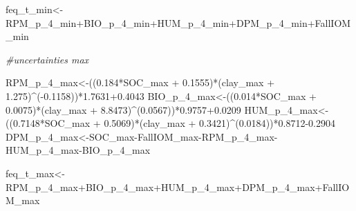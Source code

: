 \documentclass[
  10pt,
  b5paper,
]{book}
\newenvironment{Shaded}{\begin{snugshade}}{\end{snugshade}}
\newcommand{\CommentTok}[1]{\textcolor[rgb]{0.56,0.35,0.01}{\textit{#1}}}
\newcommand{\FloatTok}[1]{\textcolor[rgb]{0.00,0.00,0.81}{#1}}
\newcommand{\NormalTok}[1]{#1}
\newcommand{\OtherTok}[1]{\textcolor[rgb]{0.56,0.35,0.01}{#1}}
\newcommand{\SpecialCharTok}[1]{\textcolor[rgb]{0.00,0.00,0.00}{#1}}
\begin{document}
\begin{Shaded}
\begin{Highlighting}[]
\NormalTok{feq\_t\_min}\OtherTok{\textless{}{-}}\NormalTok{RPM\_p\_4\_min}\SpecialCharTok{+}\NormalTok{BIO\_p\_4\_min}\SpecialCharTok{+}\NormalTok{HUM\_p\_4\_min}\SpecialCharTok{+}\NormalTok{DPM\_p\_4\_min}\SpecialCharTok{+}\NormalTok{FallIOM\_min}

\CommentTok{\#uncertainties max}

\NormalTok{RPM\_p\_4\_max}\OtherTok{\textless{}{-}}\NormalTok{((}\FloatTok{0.184}\SpecialCharTok{*}\NormalTok{SOC\_max }\SpecialCharTok{+} \FloatTok{0.1555}\NormalTok{)}\SpecialCharTok{*}\NormalTok{(clay\_max }\SpecialCharTok{+} \FloatTok{1.275}\NormalTok{)}\SpecialCharTok{\^{}}\NormalTok{(}\SpecialCharTok{{-}}\FloatTok{0.1158}\NormalTok{))}\SpecialCharTok{*}\FloatTok{1.7631+0.4043}
\NormalTok{BIO\_p\_4\_max}\OtherTok{\textless{}{-}}\NormalTok{((}\FloatTok{0.014}\SpecialCharTok{*}\NormalTok{SOC\_max }\SpecialCharTok{+} \FloatTok{0.0075}\NormalTok{)}\SpecialCharTok{*}\NormalTok{(clay\_max }\SpecialCharTok{+} \FloatTok{8.8473}\NormalTok{)}\SpecialCharTok{\^{}}\NormalTok{(}\FloatTok{0.0567}\NormalTok{))}\SpecialCharTok{*}\FloatTok{0.9757+0.0209}
\NormalTok{HUM\_p\_4\_max}\OtherTok{\textless{}{-}}\NormalTok{((}\FloatTok{0.7148}\SpecialCharTok{*}\NormalTok{SOC\_max }\SpecialCharTok{+} \FloatTok{0.5069}\NormalTok{)}\SpecialCharTok{*}\NormalTok{(clay\_max }\SpecialCharTok{+} \FloatTok{0.3421}\NormalTok{)}\SpecialCharTok{\^{}}\NormalTok{(}\FloatTok{0.0184}\NormalTok{))}\SpecialCharTok{*}\FloatTok{0.8712{-}0.2904}
\NormalTok{DPM\_p\_4\_max}\OtherTok{\textless{}{-}}\NormalTok{SOC\_max}\SpecialCharTok{{-}}\NormalTok{FallIOM\_max}\SpecialCharTok{{-}}\NormalTok{RPM\_p\_4\_max}\SpecialCharTok{{-}}\NormalTok{HUM\_p\_4\_max}\SpecialCharTok{{-}}\NormalTok{BIO\_p\_4\_max}

\NormalTok{feq\_t\_max}\OtherTok{\textless{}{-}}\NormalTok{RPM\_p\_4\_max}\SpecialCharTok{+}\NormalTok{BIO\_p\_4\_max}\SpecialCharTok{+}\NormalTok{HUM\_p\_4\_max}\SpecialCharTok{+}\NormalTok{DPM\_p\_4\_max}\SpecialCharTok{+}\NormalTok{FallIOM\_max}


\end{Highlighting}
\end{Shaded}
\end{document}
